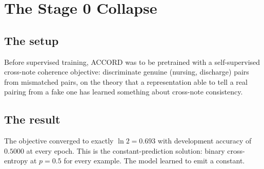 \section{The Stage 0 Collapse}
\label{sec:stage0}

\subsection{The setup}

Before supervised training, ACCORD was to be pretrained with a self-supervised
cross-note coherence objective: discriminate genuine (nursing, discharge) pairs
from mismatched pairs, on the theory that a representation able to tell a real
pairing from a fake one has learned something about cross-note consistency.

\subsection{The result}

The objective converged to exactly $\ln 2 = 0.693$ with development accuracy of
$0.5000$ at every epoch. This is the constant-prediction solution: binary
cross-entropy at $p = 0.5$ for every example. The model learned to emit a
constant.

